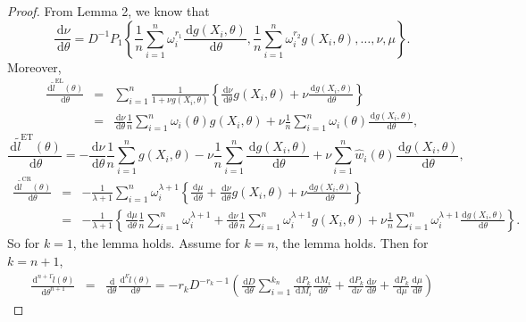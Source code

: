 \documentclass[oneside,english]{amsbook}
\numberwithin{section}{chapter}
\numberwithin{equation}{section}
\numberwithin{figure}{section}
\theoremstyle{plain}
\theoremstyle{plain}
\theoremstyle{definition}
\theoremstyle{plain}
\theoremstyle{plain}
\theoremstyle{remark}
\theoremstyle{definition}
\theoremstyle{definition}
\newcommand{\diff}{\,\mathrm{d}}
\begin{document}
\begin{proof}
From Lemma 2, we know that 
\[
\frac{\diff\nu}{\diff\theta}=D^{-1}P_{1}\left\{ \frac{1}{n}\sum_{i=1}^{n}\omega_{i}^{r_{1}}\frac{\diff g\left(X_{i},\theta\right)}{\diff\theta},\frac{1}{n}\sum_{i=1}^{n}\omega_{i}^{r_{2}}g\left(X_{i},\theta\right),\ldots,\nu,\mu\right\} .
\]
Moreover, 
\begin{eqnarray*}
\frac{\diff\tilde{l}^{\mathrm{EL}}\left(\theta\right)}{\diff\theta} & = & \sum_{i=1}^{n}\frac{1}{1+\nu g\left(X_{i},\theta\right)}\left\{ \frac{\diff\nu}{\diff\theta}g\left(X_{i},\theta\right)+\nu\frac{\diff g\left(X_{i},\theta\right)}{\diff\theta}\right\} \\
 & = & \frac{\diff\nu}{\diff\theta}\frac{1}{n}\sum_{i=1}^{n}\omega_{i}\left(\theta\right)g\left(X_{i},\theta\right)+\nu\frac{1}{n}\sum_{i=1}^{n}\omega_{i}\left(\theta\right)\frac{\diff g\left(X_{i},\theta\right)}{\diff\theta},
\end{eqnarray*}
\[
\frac{\diff\tilde{l}^{\mathrm{ET}}\left(\theta\right)}{\diff\theta}=-\frac{\diff\nu}{\diff\theta}\frac{1}{n}\sum_{i=1}^{n}g\left(X_{i},\theta\right)-\nu\frac{1}{n}\sum_{i=1}^{n}\frac{\diff g\left(X_{i},\theta\right)}{\diff\theta}+\nu\sum_{i=1}^{n}\hat{w}_{i}\left(\theta\right)\frac{\diff g\left(X_{i},\theta\right)}{\diff\theta},
\]
\begin{eqnarray*}
\frac{\diff\tilde{l}^{\mathrm{CR}}\left(\theta\right)}{\diff\theta} & = & -\frac{1}{\lambda+1}\sum_{i=1}^{n}\omega_{i}^{\lambda+1}\left\{ \frac{\diff\mu}{\diff\theta}+\frac{\diff\nu}{\diff\theta}g\left(X_{i},\theta\right)+\nu\frac{\diff g\left(X_{i},\theta\right)}{\diff\theta}\right\} \\
 & = & -\frac{1}{\lambda+1}\left\{ \frac{\diff\mu}{\diff\theta}\frac{1}{n}\sum_{i=1}^{n}\omega_{i}^{\lambda+1}+\frac{\diff\nu}{\diff\theta}\frac{1}{n}\sum_{i=1}^{n}\omega_{i}^{\lambda+1}g\left(X_{i},\theta\right)+\nu\frac{1}{n}\sum_{i=1}^{n}\omega_{i}^{\lambda+1}\frac{\diff g\left(X_{i},\theta\right)}{\diff\theta}\right\} .
\end{eqnarray*}
So for $k=1$, the lemma holds. Assume for $k=n$, the lemma holds. Then 
for $k=n+1$, 
\begin{eqnarray*}
\frac{\diff^{n+1}\tilde{l}\left(\theta\right)}{\diff\theta^{n+1}} & = & \frac{\diff}{\diff\theta_{}}\frac{\diff^{k}\tilde{l}\left(\theta\right)}{\diff\theta}=-r_{k}D^{-r_{k}-1}\left(\frac{\diff D}{\diff\theta}\sum_{i=1}^{k_{n}}\frac{\diff P_{k}}{\diff M_{i}}\frac{\diff M_{i}}{\diff\theta}+\frac{\diff P_{k}}{\diff\nu}\frac{\diff\nu}{\diff\theta}+\frac{\diff P_{k}}{\diff\mu}\frac{\diff\mu}{\diff\theta}\right)

\end{eqnarray*}
\end{proof}
\end{document}
